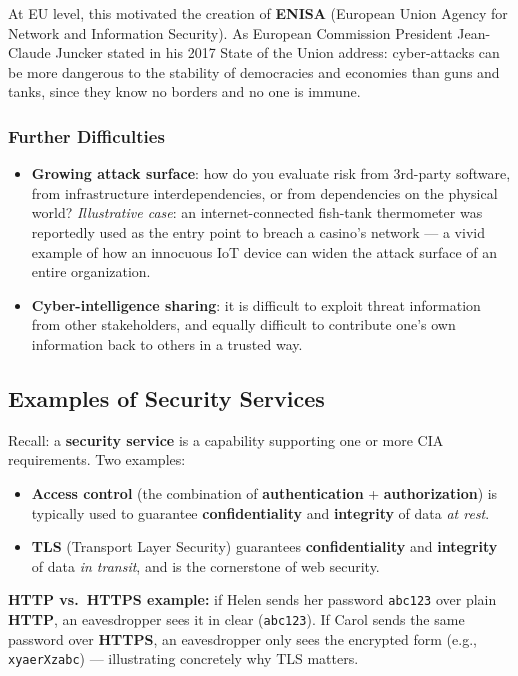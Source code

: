 \documentclass[12pt, a4paper]{article}
\begin{document}
At EU level, this motivated the creation of \textbf{ENISA} (European Union Agency for Network and Information Security). As European Commission President Jean-Claude Juncker stated in his 2017 State of the Union address: cyber-attacks can be more dangerous to the stability of democracies and economies than guns and tanks, since they know no borders and no one is immune.

\subsubsection{Further Difficulties}
\begin{itemize}
    \item \textbf{Growing attack surface}: how do you evaluate risk from 3rd-party software, from infrastructure interdependencies, or from dependencies on the physical world? \emph{Illustrative case}: an internet-connected fish-tank thermometer was reportedly used as the entry point to breach a casino's network — a vivid example of how an innocuous IoT device can widen the attack surface of an entire organization.
    \item \textbf{Cyber-intelligence sharing}: it is difficult to exploit threat information from other stakeholders, and equally difficult to contribute one's own information back to others in a trusted way.
\end{itemize}

\subsection{Examples of Security Services}

Recall: a \textbf{security service} is a capability supporting one or more CIA requirements. Two examples:

\begin{itemize}
    \item \textbf{Access control} (the combination of \textbf{authentication} + \textbf{authorization}) is typically used to guarantee \textbf{confidentiality} and \textbf{integrity} of data \emph{at rest}.
    \item \textbf{TLS} (Transport Layer Security) guarantees \textbf{confidentiality} and \textbf{integrity} of data \emph{in transit}, and is the cornerstone of web security.
\end{itemize}

\textbf{HTTP vs.\ HTTPS example:} if Helen sends her password \texttt{abc123} over plain \textbf{HTTP}, an eavesdropper sees it in clear (\texttt{abc123}). If Carol sends the same password over \textbf{HTTPS}, an eavesdropper only sees the encrypted form (e.g., \texttt{xyaerXzabc}) — illustrating concretely why TLS matters.
\end{document}
